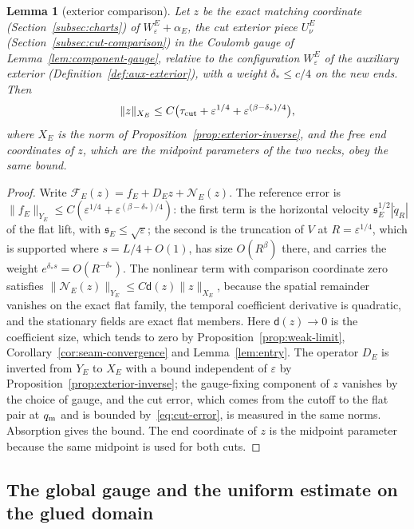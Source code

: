 \documentclass[11pt]{amsart}
\newtheorem{lemma}[theorem]{Lemma}
\theoremstyle{definition}
\theoremstyle{remark}
\theoremstyle{plain}
\numberwithin{equation}{section}
\newcommand{\eps}{\varepsilon}
\begin{document}
\begin{lemma}[exterior comparison]\label{lem:exterior-comparison}
Let $z$ be the exact matching coordinate (Section~\ref{subsec:charts}) of
$W^E_\eps+\alpha_E$, the cut exterior piece $U^E_\nu$ (Section~\ref{subsec:cut-comparison}) in the Coulomb gauge of Lemma~\ref{lem:component-gauge}, relative to the
configuration $W^E_\eps$ of the auxiliary exterior (Definition~\ref{def:aux-exterior}),
with a weight $\delta_*\le c/4$ on the new ends.
Then
\[
\|z\|_{X_E}\le C\bigl(\tau_{\rm cut}+\eps^{1/4}+\eps^{(\beta-\delta_*)/4}\bigr),
\]
where $X_E$ is the norm of Proposition~\ref{prop:exterior-inverse}, and the free end
coordinates of $z$, which are the midpoint parameters of the two necks, obey the same
bound.
\end{lemma}

\begin{proof}
Write $\mathcal F_E(z)=f_E+D_Ez+\mathcal N_E(z)$. The reference error is
$\|f_E\|_{Y_E}\le C(\eps^{1/4}+\eps^{(\beta-\delta_*)/4})$: the first term is the
horizontal velocity ${\mathfrak s}_E^{1/2}|\dot q_R|$ of the flat lift, with
${\mathfrak s}_E\le\sqrt\eps$; the second is the truncation of $V$ at $R=\eps^{1/4}$, which is
supported where $s=L/4+O(1)$, has size $O(R^\beta)$ there, and carries the weight
$e^{\delta_*s}=O(R^{-\delta_*})$. The nonlinear term with comparison coordinate zero
satisfies $\|\mathcal N_E(z)\|_{Y_E}\le C\mathsf d(z)\|z\|_{X_E}$, because the spatial
remainder vanishes on the exact flat family, the temporal coefficient derivative is
quadratic, and the stationary fields are exact flat members. Here $\mathsf d(z)\to0$
is the coefficient size, which tends to zero by Proposition~\ref{prop:weak-limit},
Corollary~\ref{cor:seam-convergence} and Lemma~\ref{lem:entry}. The operator $D_E$ is
inverted from $Y_E$ to $X_E$ with a bound independent of $\eps$ by
Proposition~\ref{prop:exterior-inverse}; the gauge-fixing component of $z$ vanishes by the choice of
gauge, and the cut error, which comes from the cutoff to the flat pair at $q_{\rm m}$ and
is bounded by~\eqref{eq:cut-error}, is measured in the same norms. Absorption gives
the bound. The end coordinate of $z$ is the midpoint parameter
because the same midpoint is used for both cuts.
\end{proof}

\subsection{The global gauge and the uniform estimate on the glued domain}\label{subsec:global-gauge}
\end{document}
